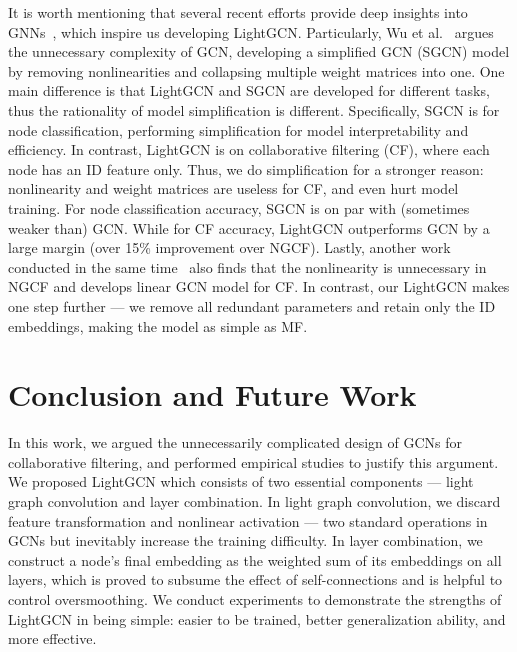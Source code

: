 \documentclass[sigconf]{acmart}
\theoremstyle{definition}
\begin{document}
It is worth mentioning that several recent efforts provide deep insights into GNNs~\cite{DeepInsights,ICLR19-APPNP,SGCN}, which inspire us developing LightGCN. Particularly, Wu et al.~\cite{SGCN} argues the unnecessary complexity of GCN, developing a simplified GCN (SGCN) model by removing nonlinearities and collapsing multiple weight matrices into one. 
One main difference is that LightGCN and SGCN are developed for different tasks, thus the rationality of model simplification is different. Specifically, SGCN is for node classification, performing simplification for model interpretability and efficiency. In contrast, LightGCN is on collaborative filtering (CF), where each node has an ID feature only. Thus, we do simplification for a stronger reason: nonlinearity and weight matrices are useless for CF, and even hurt model training. For node classification accuracy, SGCN is on par with (sometimes weaker than) GCN. While for CF accuracy, LightGCN outperforms GCN by a large margin (over 15\% improvement over NGCF). 
Lastly, another work conducted in the same time~\cite{LR-GCCF} also finds that the nonlinearity is unnecessary in NGCF and develops linear GCN model for CF. In contrast, our LightGCN makes one step further --- we remove all redundant parameters and retain only the ID embeddings, making the model as simple as MF. 








 \section{Conclusion and Future Work} \label{sec:conclusion}
In this work, we argued the unnecessarily complicated design of GCNs for collaborative filtering, and performed empirical studies to justify this argument. 
We proposed LightGCN which consists of two essential components --- light graph convolution and layer combination. 
In light graph convolution, we 
discard feature transformation and nonlinear activation --- two standard operations in GCNs but inevitably increase the training difficulty. In layer combination, we construct a node's final embedding as the weighted sum of its embeddings on all layers, which is proved to subsume the effect of self-connections and is helpful to control oversmoothing. 
We conduct experiments to demonstrate the strengths of LightGCN in being simple: easier to be trained, better generalization ability, and more effective. 
\end{document}
